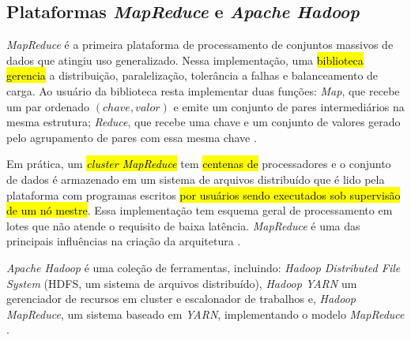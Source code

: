 \subsection{Plataformas \emph{MapReduce} e \emph{Apache Hadoop}}

\emph{MapReduce} é a primeira plataforma de processamento de conjuntos massivos
de dados que atingiu uso generalizado.
Nessa implementação, uma 
\hl{biblioteca gerencia} 
a distribuição, paralelização, tolerância a falhas e balanceamento de
carga.
Ao usuário da biblioteca resta implementar duas funções:
\emph{Map}, que recebe um par ordenado
$(chave, valor)$ e emite um conjunto de pares intermediários na mesma estrutura;
\emph{Reduce}, que recebe uma chave e um conjunto de valores gerado pelo agrupamento
de pares com essa mesma chave \cite{Dean2004}.

Em prática, um \notahelio{!!}\hl{\emph{cluster MapReduce}} tem \hl{centenas de} processadores e o conjunto de dados é
armazenado em um sistema de arquivos distribuído que é lido pela plataforma com
programas escritos \hl{por usuários sendo executados sob supervisão de um nó mestre}.
Essa implementação tem esquema geral de processamento em lotes que não atende o
requisito de baixa latência.
\nobreakdash \emph{MapReduce} é uma das principais influências na criação da arquitetura
\lambdaa \cite{marz2015big}.

\emph{Apache Hadoop} é uma coleção de ferramentas, incluindo: \emph{Hadoop
Distributed File System} (HDFS, um sistema de arquivos distribuído), \emph{Hadoop
YARN} um gerenciador de recursos em cluster e escalonador de trabalhos e,
\emph{Hadoop MapReduce}, um sistema baseado em \emph{YARN}, implementando o modelo
\emph{MapReduce} \cite{ApacheHadoop2020}.





